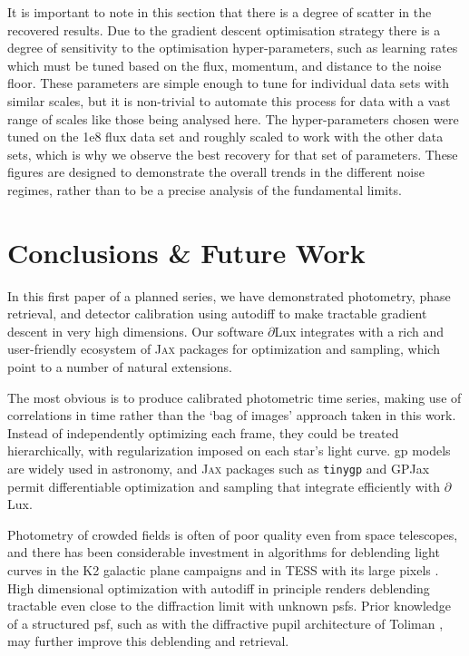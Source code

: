 \documentclass[]{spieman}
\newcommand\jax{\textsc{Jax}\xspace}
\newcommand\dlux{$\partial$Lux\xspace}
\begin{document}
It is important to note in this section that there is a degree of scatter in the recovered results. Due to the gradient descent optimisation strategy there is a degree of sensitivity to the optimisation hyper-parameters, such as learning rates which must be tuned based on the flux, momentum, and distance to the noise floor. These parameters are simple enough to tune for individual data sets with similar scales, but it is non-trivial to automate this process for data with a vast range of scales like those being analysed here. The hyper-parameters chosen were tuned on the 1e8 flux data set and roughly scaled to work with the other data sets, which is why we observe the best recovery for that set of parameters. These figures are designed to demonstrate the overall trends in the different noise regimes, rather than to be a precise analysis of the fundamental limits.

\section{Conclusions \& Future Work}
In this first paper of a planned series, we have demonstrated photometry, phase retrieval, and detector calibration using autodiff to make tractable gradient descent in very high dimensions. Our software \dlux integrates with a rich and user-friendly ecosystem of \jax packages for optimization and sampling, which point to a number of natural extensions.

The most obvious is to produce calibrated photometric time series, making use of correlations in time rather than the `bag of images' approach taken in this work. Instead of independently optimizing each frame, they could be treated hierarchically, with regularization imposed on each star's light curve. \ac{gp} models are widely used in astronomy, and \jax packages such as \texttt{tinygp} \cite{Aigrain2022} and GPJax \cite{Pinder2022} permit differentiable optimization and sampling that integrate efficiently with \dlux. 

Photometry of crowded fields is often of poor quality even from space telescopes, and there has been considerable investment in algorithms for deblending light curves in the K2 galactic plane campaigns \cite{Zhu2017} and in TESS with its large pixels \cite{Nardiello2019,Hedges2021,Higgins2022}. High dimensional optimization with autodiff in principle renders deblending tractable even close to the diffraction limit with unknown \ac{psf}s. Prior knowledge of a structured \ac{psf}, such as with the diffractive pupil architecture of Toliman \cite{Guyon2012,Guyon2013}, may further improve this deblending and retrieval. 
\end{document}
